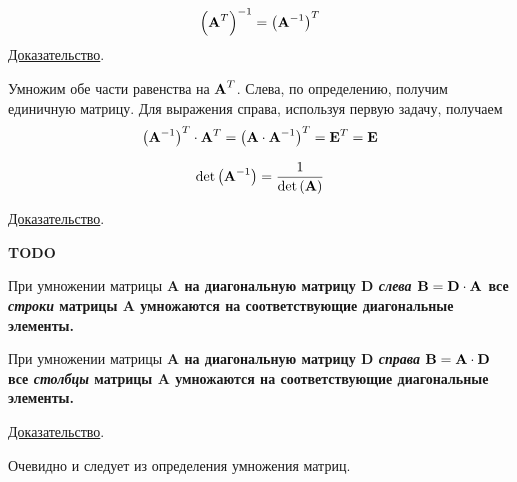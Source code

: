 \documentclass[../../calc-math-exam-2023.tex]{subfiles}
\begin{document}
    \begin{theorem}
        \begin{equation*}
            \left( \bf{A}^T \right)^{-1} = \left( \bf{A}^{-1} \right)^T
        \end{equation*}
        \underline{Доказательство}.

        Умножим обе части равенства на $\displaystyle \bf{A}^T$. Слева, по определению,
        получим единичную матрицу. Для выражения справа, используя первую задачу, получаем
        \begin{equation*}
            \left( \bf{A}^{-1} \right)^T \cdot \bf{A}^T = \left( \bf{A} \cdot \bf{A}^{-1} \right)^T = \bf{E}^T = \bf{E}
        \end{equation*}
    \end{theorem}

    \begin{theorem}
        \begin{equation*}
            \det \left( \bf{A}^{-1} \right) = \frac{1}{\det\left( \bf{A} \right)}
        \end{equation*}

        \underline{Доказательство}.

        \bf{TODO}
    \end{theorem}

    \begin{theorem}
        При умножении матрицы \bf{A} на диагональную матрицу \bf{D} \emph{слева} $\bf{B} = \bf{D} \cdot \bf{A}$
        все \emph{строки} матрицы \bf{A} умножаются на соответствующие диагональные элементы.

        При умножении матрицы \bf{A} на диагональную матрицу \bf{D} \emph{справа} $\bf{B} = \bf{A} \cdot \bf{D}$
        все \emph{столбцы} матрицы \bf{A} умножаются на соответствующие диагональные элементы.

        \underline{Доказательство}.

        Очевидно и следует из определения умножения матриц.
    \end{theorem}
\end{document}
